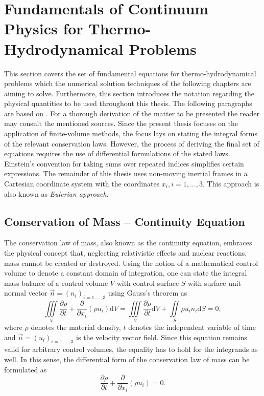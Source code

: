 \section{Fundamentals of Continuum Physics for Thermo-Hydrodynamical Problems}
\label{sec:fundamentals}

This section covers the set of fundamental equations for thermo-hydrodynamical problems which the numerical solution techniques of the following chapters are aiming to solve. Furthermore, this section introduces the notation regarding the physical quantities to be used throughout this thesis. The following paragraphs are based on \cite{andersson84,ferziger02,kundu12,spurk10}. For a thorough derivation of the matter to be presented the reader may consult the mentioned sources. Since the present thesis focuses on the application of finite-volume methods, the focus lays on stating the integral forms of the relevant conservation laws. However, the process of deriving the final set of equations requires the use of differential formulations of the stated laws. Einstein's convention for taking sums over repeated indices simplifies certain expressions. The remainder of this thesis uses non-moving inertial frames in a Cartesian coordinate system with the coordinates \( x_i, i=1,...,3 \). This approach is also known as \emph{Eulerian approach}.  

\subsection{Conservation of Mass -- Continuity Equation}

The conservation law of mass, also known as the continuity equation, embraces the physical concept that, neglecting relativistic effects and nuclear reactions, mass cannot be created or destroyed. Using the notion of a mathematical control volume to denote a constant domain of integration, one can state the integral mass balance of a control volume \(V\) with control surface \(S\) with surface unit normal vector \(\vec{n} = \left( n_i \right)_{i=1,\dots,3}\) using Gauss's theorem as
\begin{displaymath}
  \iiint\limits_V \frac{\partial \rho}{\partial t} + \frac{\partial}{\partial x_i}\left( \rho u_i \right) \mathrm{d}V 
  =  \iiint\limits_V \frac{\partial \rho}{\partial t} \mathrm{d}V + \iint\limits_S \rho u_i n_i \mathrm{d}S
  = 0,
\end{displaymath}
where \( \rho \) denotes the material density, \(t\) denotes the independent variable of time and \(\vec{u} = \left( u_i \right)_{i=1,\dots,3}\) is the velocity vector field. Since this equation remains valid for arbitrary control volumes, the equality has to hold for the integrands as well. In this sense, the differential form of the conservation law of mass can be formulated as
\begin{equation}
  \label{eq:contifull}
  \frac{\partial \rho}{\partial t} + \frac{\partial}{\partial x_i}\left( \rho u_i \right)
  = 0.
\end{equation}

